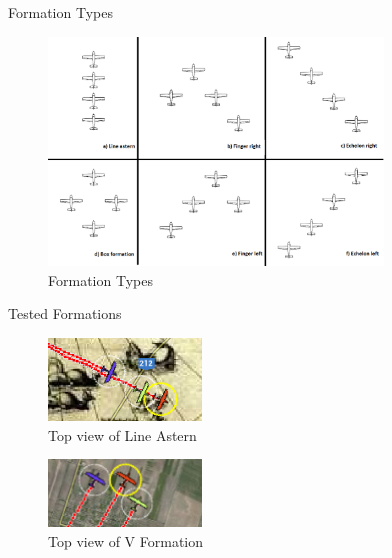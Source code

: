 \documentclass{beamer}
\begin{document}

\begin{frame}{Formation Types}
\begin{center}
\begin{figure}[p]
\includegraphics[width=3.5in]{img/4form.png}
\caption {Formation Types}
\end{figure}
\end{center}
\end{frame}

\begin{frame}{Tested Formations}
% 
\begin{figure}[p]
\includegraphics[width=1.6in]{img/lqgc.png}
\caption{Top view of Line Astern}
\end{figure}
\begin{figure}[p]
\includegraphics[width=1.6in]{img/vqgc.png}
\caption{Top view of V Formation}
\end{figure}
\end{frame}
\end{document}
